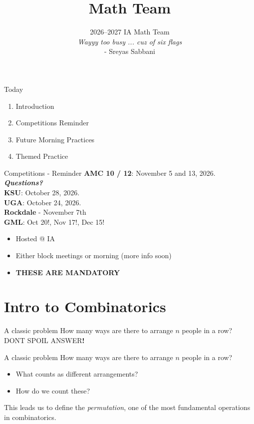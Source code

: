 \documentclass[aspectratio=169,xcolor=dvipsnames]{beamer}
\title[Jared Math Team Goff]{Math Team}
\subtitle{2026--2027 IA Math Team\\[0.8em]\textit{Wayyy too busy ... cuz of six flags}\\[-0.2em]{\scriptsize - Sreyas Sabbani}}
\begin{document}
\begin{frame}
    \titlepage
\end{frame}

\begin{frame}[t]{Today}
\vspace{0.35cm}
\begin{enumerate}
    \item Introduction
    \item Competitions Reminder
    \item Future Morning Practices
    \item Themed Practice
\end{enumerate}
\end{frame}

\begin{frame}[t]{Competitions - Reminder}
\vspace{0.35cm}
\textbf{AMC 10 / 12}: November 5 and 13, 2026. \textbf{\textit{Questions?}} \\
\textbf{KSU}: October 28, 2026. \\
\textbf{UGA}: October 24, 2026. \\
\textbf{Rockdale} - November 7th \\
\textbf{GML}: Oct 20!, Nov 17!, Dec 15!\\
\begin{itemize}
    \small \item Hosted @ IA
    \item Either block meetings or morning (more info soon)
    \item \textbf{THESE ARE MANDATORY}
\end{itemize}
\end{frame}

\section{Intro to Combinatorics}

\begin{frame}[t]{A classic problem}
    How many ways are there to arrange $n$ people in a row?
    DONT SPOIL ANSWER\textbf{!}
\end{frame}

\begin{frame}[t]{A classic problem}
    How many ways are there to arrange $n$ people in a row?

    \begin{itemize}
        \item What counts as different arrangements? 
        \item How do we count these?
    \end{itemize}
    
    \vspace{4cm}
    
    This leads us to define the \textit{permutation}, one of the most fundamental operations in combinatorics.
\end{frame}
\end{document}
